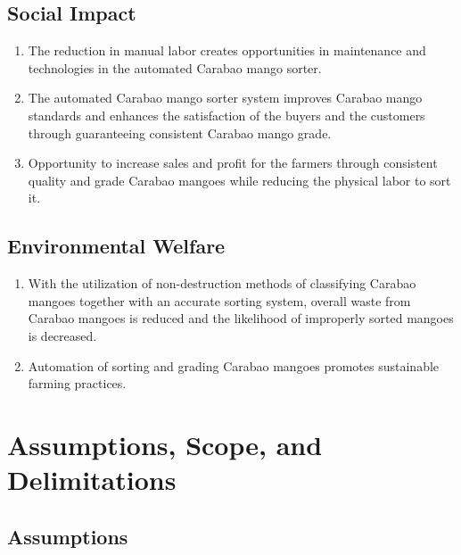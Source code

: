 \subsection{Social Impact}

\begin{enumerate}
	\item The reduction in manual labor creates opportunities in maintenance and
	technologies in the automated \gls{Carabao mango}  sorter.
	
	\item The automated \gls{Carabao mango}  sorter system improves Carabao mango 
	standards and enhances the satisfaction of the buyers and the customers through
	guaranteeing consistent Carabao mango grade.
	
	\item Opportunity to increase sales and profit for the farmers through consistent 
	quality and grade Carabao mangoes while reducing the physical labor to sort it.
\end{enumerate}

\subsection{Environmental Welfare}

\begin{enumerate}
	\item With the utilization of non-destruction methods of classifying Carabao mangoes together with an
	accurate sorting system, overall waste from Carabao mangoes is reduced and the likelihood
	of improperly sorted mangoes is decreased.
	
	\item Automation of sorting and grading Carabao mangoes promotes sustainable farming practices.
	
\end{enumerate}



\section{Assumptions, Scope, and Delimitations}

\subsection{Assumptions}

